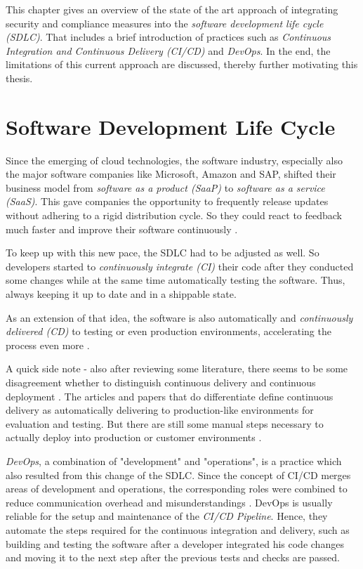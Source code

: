 
This chapter gives an overview of the state of the art approach of integrating security and compliance measures into the \textit{software development life cycle (SDLC)}. That includes a brief introduction of practices such as \textit{Continuous Integration and Continuous Delivery (CI/CD)} and \textit{DevOps}. In the end, the limitations of this current approach are discussed, thereby further motivating this thesis. 

\section{Software Development Life Cycle}
Since the emerging of cloud technologies, the software industry, especially also the major software companies like Microsoft, Amazon and SAP, shifted their business model from \textit{software as a product (SaaP)} to \textit{software as a service (SaaS)}. This gave companies the opportunity to frequently release updates without adhering to a rigid distribution cycle. So they could react to feedback much faster and improve their software continuously \cite{DevSecOps, ContinuousSecurity}.\par
To keep up with this new pace, the SDLC had to be adjusted as well. So developers started to \emph{continuously integrate (CI)} their code after they conducted some changes while at the same time automatically testing the software. Thus, always keeping it up to date and in a shippable state.\par
As an extension of that idea, the software is also automatically and \emph{continuously delivered (CD)} to testing or even production environments, accelerating the process even more \cite{CICD}.\par 
A quick side note - also after reviewing some literature, there seems to be some disagreement whether to distinguish continuous delivery and continuous deployment \cite{CICD, DevSecOps}. The articles and papers that do differentiate define continuous delivery as automatically delivering to production-like environments for evaluation and testing. But there are still some manual steps necessary to actually deploy into production or customer environments \cite{CICD, CICDDebate1, SecureCloudApplications}.\par
\emph{DevOps}, a combination of "development" and "operations", is a practice which also resulted from this change of the SDLC. Since the concept of CI/CD merges areas of development and operations, the corresponding roles were combined to reduce communication overhead and misunderstandings \cite{SecureCloudApplications}. DevOps is usually reliable for the setup and maintenance of the \emph{CI/CD Pipeline}. Hence, they automate the steps required for the continuous integration and delivery, such as building and testing the software after a developer integrated his code changes and moving it to the next step after the previous tests and checks are passed. 

